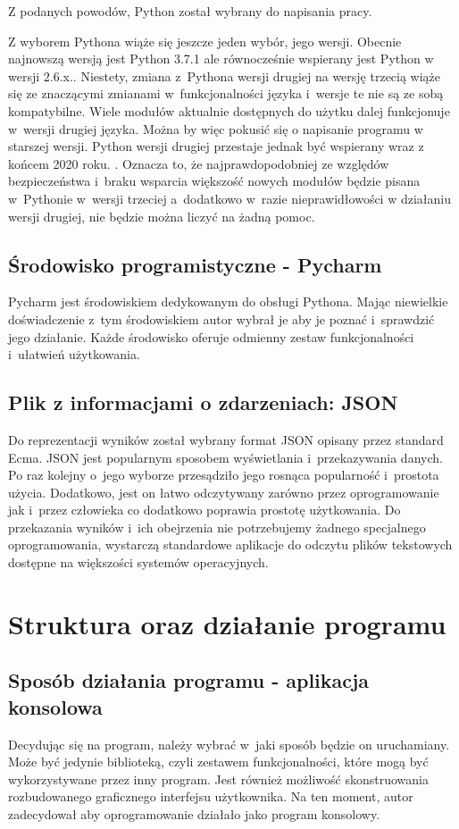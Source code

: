 \documentclass[eng,printmode]{mgr}
\begin{document}
Z podanych powodów, Python został wybrany do napisania pracy.

Z wyborem Pythona wiąże się jeszcze jeden wybór, jego wersji. Obecnie najnowszą wersją jest Python 3.7.1 ale równocześnie wspierany jest Python w wersji 2.6.x.\cite{Python_latest_release}. Niestety, zmiana z~Pythona wersji drugiej na wersję trzecią wiąże się ze znaczącymi zmianami w~funkcjonalności języka i~wersje te nie są ze sobą kompatybilne. Wiele modułów aktualnie dostępnych do użytku dalej funkcjonuje w~wersji drugiej języka. Można by więc pokusić się o napisanie programu w starszej wersji. Python wersji drugiej przestaje jednak być wspierany wraz z końcem 2020 roku. \cite{Python_end_of_life}. Oznacza to, że najprawdopodobniej ze względów bezpieczeństwa i~braku wsparcia większość nowych modułów będzie pisana w~Pythonie w~wersji trzeciej a~dodatkowo w~razie nieprawidłowości w działaniu wersji drugiej, nie będzie można liczyć na żadną pomoc.


\section{Środowisko programistyczne - Pycharm}
Pycharm jest środowiskiem dedykowanym do obsługi Pythona. Mając niewielkie doświadczenie z~tym środowiskiem autor wybrał je aby je poznać i~sprawdzić jego działanie. Każde środowisko oferuje odmienny zestaw funkcjonalności i~ułatwień użytkowania.

\section{Plik z informacjami o zdarzeniach: JSON}
Do reprezentacji wyników został wybrany format JSON opisany przez standard Ecma\cite{JSON}. JSON jest popularnym sposobem wyświetlania i~przekazywania danych. Po raz kolejny o~jego wyborze przesądziło jego rosnąca popularność i~prostota użycia\cite{JSON_popular}. Dodatkowo, jest on łatwo odczytywany zarówno przez oprogramowanie jak i~przez człowieka co dodatkowo poprawia prostotę użytkowania. Do przekazania wyników i~ich obejrzenia nie potrzebujemy żadnego specjalnego oprogramowania, wystarczą standardowe aplikacje do odczytu plików tekstowych dostępne na większości systemów operacyjnych.
\chapter{Struktura oraz działanie programu}
\section{Sposób działania programu - aplikacja konsolowa}\label{sposób}
Decydując się na program, należy wybrać w~jaki sposób będzie on uruchamiany. Może być jedynie biblioteką, czyli zestawem funkcjonalności, które mogą być wykorzystywane przez inny program. Jest również możliwość skonstruowania rozbudowanego graficznego interfejsu użytkownika. Na ten moment, autor zadecydował aby oprogramowanie działało jako program konsolowy. 
\end{document}

